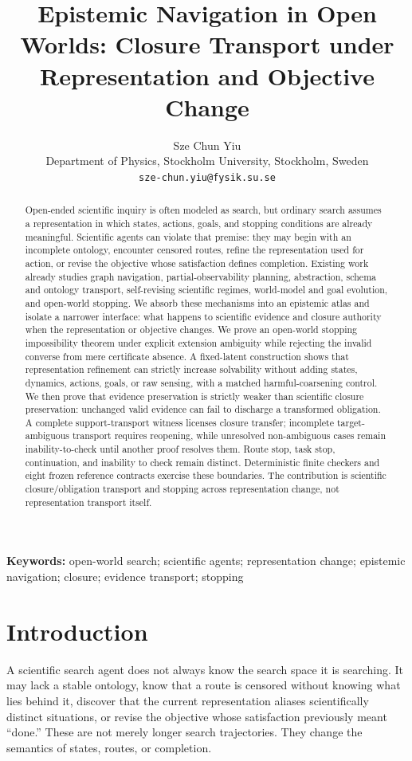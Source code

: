 \documentclass[11pt]{article}
\title{Epistemic Navigation in Open Worlds: Closure Transport under Representation and Objective Change}
\author{Sze Chun Yiu\\Department of Physics, Stockholm University, Stockholm, Sweden\\\texttt{sze-chun.yiu@fysik.su.se}}
\date{}
\begin{document}
\maketitle

\begin{abstract}
Open-ended scientific inquiry is often modeled as search, but ordinary search assumes a representation in which states, actions, goals, and stopping conditions are already meaningful. Scientific agents can violate that premise: they may begin with an incomplete ontology, encounter censored routes, refine the representation used for action, or revise the objective whose satisfaction defines completion. Existing work already studies graph navigation, partial-observability planning, abstraction, schema and ontology transport, self-revising scientific regimes, world-model and goal evolution, and open-world stopping. We absorb these mechanisms into an epistemic atlas and isolate a narrower interface: what happens to scientific evidence and closure authority when the representation or objective changes. We prove an open-world stopping impossibility theorem under explicit extension ambiguity while rejecting the invalid converse from mere certificate absence. A fixed-latent construction shows that representation refinement can strictly increase solvability without adding states, dynamics, actions, goals, or raw sensing, with a matched harmful-coarsening control. We then prove that evidence preservation is strictly weaker than scientific closure preservation: unchanged valid evidence can fail to discharge a transformed obligation. A complete support-transport witness licenses closure transfer; incomplete target-ambiguous transport requires reopening, while unresolved non-ambiguous cases remain inability-to-check until another proof resolves them. Route stop, task stop, continuation, and inability to check remain distinct. Deterministic finite checkers and eight frozen reference contracts exercise these boundaries. The contribution is scientific closure/obligation transport and stopping across representation change, not representation transport itself.
\end{abstract}

\noindent\textbf{Keywords:} open-world search; scientific agents; representation change; epistemic navigation; closure; evidence transport; stopping

\section{Introduction}
A scientific search agent does not always know the search space it is searching. It may lack a stable ontology, know that a route is censored without knowing what lies behind it, discover that the current representation aliases scientifically distinct situations, or revise the objective whose satisfaction previously meant ``done.'' These are not merely longer search trajectories. They change the semantics of states, routes, or completion.
\end{document}
